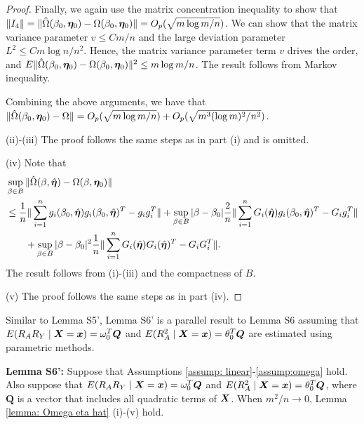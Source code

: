 \documentclass[12pt]{article}
\begin{document}
{\begin{proof}
	
	Finally, we again use the matrix concentration inequality \citet[Theorem 1]{tropp2015expected}  to show that $ \|I_4\|= 	\|\hat \Omega(\beta_0, \bm \eta_0)-  \Omega(\beta_0, \bm \eta_0)\| =O_p(\sqrt{m\log m/n}) $. We can show that the matrix variance parameter $ v \leq Cm/n$ and the large deviation parameter $ L^2 \leq Cm\log n/n^2$.  Hence, the matrix variance parameter term $ v $ drives the order, and  $ E	\|\hat \Omega(\beta_0, \bm \eta_0)-  \Omega(\beta_0, \bm \eta_0)\|^2\leq   m\log m/n $. The result follows  from Markov inequality. 

	
Combining the above arguments, we have that $ \|\hat{\Omega}(\beta_0,\bm \eta_0) - \Omega\| = O_p(\sqrt{m\log m/n}) + O_p(\sqrt{m^3(\log m)^2/n^2})$. 
	
	(ii)-(iii) The proof follows the same steps as in part (i) and is omitted. 
	
	(iv) Note that 
	\begin{align*}
		&	\sup_{\beta\in B} \|\hat\Omega(\beta,\hat {\bm \eta})- \Omega(\beta, \bm \eta_0)\| \\
		&\leq \frac{1}{n}\| \sum_{i=1}^{n} g_i(\beta_0, \hat {\bm \eta})g_i(\beta_0, \hat {\bm \eta})^T - g_i g_i^T   \| +   	\sup_{\beta\in B}  |\beta- \beta_0| \frac{2}{n}\| \sum_{i=1}^{n} G_i(\hat {\bm \eta})g_i(\beta_0, \hat {\bm \eta})^T - G_i g_i^T   \| \\
		&\qquad + 		  	\sup_{\beta\in B}  |\beta- \beta_0|^2 \frac{1}{n}\| \sum_{i=1}^{n} G_i(\hat {\bm \eta})G_i( \hat {\bm \eta})^T - G_i G_i^T   \|. 
	\end{align*}
The result follows from (i)-(iii) and the compactness of $ B $. 

(v) The proof follows the same steps as in part (iv). 
\end{proof}

{Similar to Lemma S5', Lemma S6' is a parallel result to Lemma S6 assuming that $E(R_A R_Y\mid \bm{X} = \bm x ) = \omega_0^T \bm Q $ and $E(R_A^2 \mid \bm{X} = \bm x ) = \theta_0^T \bm Q $ are estimated using parametric methods.  

{\bf Lemma S6':}
Suppose that Assumptions \ref{assump: linear}-\ref{assump:omega} hold. Also suppose that  $E(R_A R_Y\mid \bm{X} = \bm x ) = \omega_0^T \bm Q $ and $E(R_A^2 \mid \bm{X} = \bm x ) = \theta_0^T \bm Q $, where $\bm Q$ is a vector that includes all quadratic terms of $\bm{X}$.  When $m^2/n\to 0$,   Lemma \ref{lemma: Omega eta hat} (i)-(v)  hold.

}}
\end{document}
